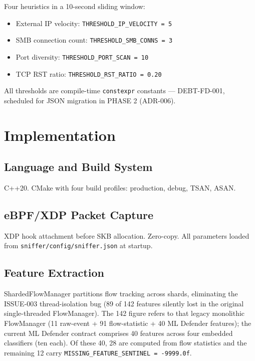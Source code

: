 \documentclass[11pt,a4paper]{article}
\begin{document}
    Four heuristics in a 10-second sliding window:

    \begin{itemize}
        \item External IP velocity: \texttt{THRESHOLD\_IP\_VELOCITY = 5}
        \item SMB connection count: \texttt{THRESHOLD\_SMB\_CONNS = 3}
        \item Port diversity: \texttt{THRESHOLD\_PORT\_SCAN = 10}
        \item TCP RST ratio: \texttt{THRESHOLD\_RST\_RATIO = 0.20}
    \end{itemize}

    All thresholds are compile-time \texttt{constexpr} constants --- DEBT-FD-001, scheduled for
    JSON migration in PHASE 2 (ADR-006).

    \section{Implementation}

    \subsection{Language and Build System}
    C++20. CMake with four build profiles: production, debug, TSAN, ASAN.

    \subsection{eBPF/XDP Packet Capture}
    XDP hook attachment before SKB allocation. Zero-copy. All parameters loaded from
    \texttt{sniffer/config/sniffer.json} at startup.

    \subsection{Feature Extraction}

    ShardedFlowManager partitions flow tracking across shards, eliminating the ISSUE-003
    thread-isolation bug (89 of 142 features silently lost in the original single-threaded
    FlowManager). The 142 figure refers to that legacy monolithic FlowManager
    (11 raw-event + 91 flow-statistic + 40 ML Defender features); the current ML Defender
    contract comprises 40 features across four embedded classifiers (ten each). Of these 40,
    28 are computed from flow statistics and the remaining 12 carry
    \texttt{MISSING\_FEATURE\_SENTINEL = -9999.0f}.
\end{document}
